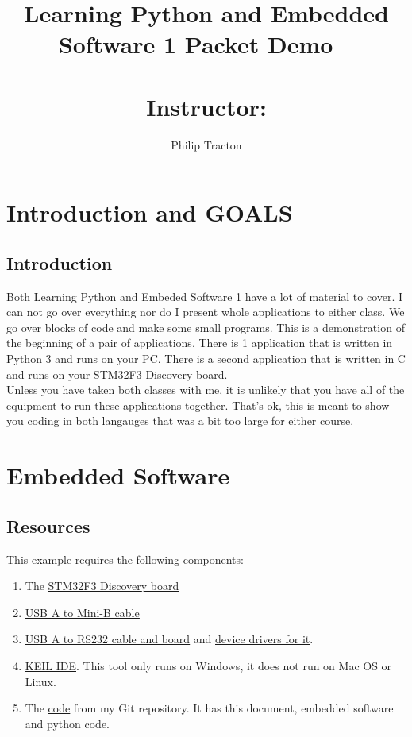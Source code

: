 \documentclass[12pt, svgnames, titlepage]{report}
\title{Learning Python and Embedded Software 1 Packet Demo}
\author{Philip Tracton}
\date{}
\title{
\vspace{2in}
\textmd{\textbf{\hmwkClass\ \\ \hmwkTitle}}\\
\vspace{0.1in}\normalsize{Instructor: \textit{\hmwkClassInstructor}}\\
}
\author{\textbf{\hmwkAuthorName}}
\date{} %
\begin{document}
\maketitle


\tableofcontents
\newpage

\chapter{Introduction and GOALS}
\section{Introduction}
\noindent Both Learning Python and Embeded Software 1 have a lot of material to cover.  I can not go over everything nor do I present whole applications to either class.  We go over blocks of code and make some small programs.  This is a demonstration of the beginning of a pair of applications.  There is 1 application that is written in Python 3 and runs on your PC.  There is a second application that is written in C and runs on your \underline{\href{http://www.st.com/web/en/catalog/tools/FM116/SC959/SS1532/PF254044}{STM32F3 Discovery board}}.  \\

\vspace{0.5cm}
\noindent Unless you have taken both classes with me, it is unlikely that you have all of the equipment to run these applications together.  That's ok, this is meant to show you coding in both langauges that was a bit too large for either course.  \\

\chapter{Embedded Software}
\section{Resources}
This example requires the following components:
\begin{enumerate}
\item The \underline{\href{http://www.st.com/web/en/catalog/tools/FM116/SC959/SS1532/PF254044}{STM32F3 Discovery board}}
\item \underline{\href{http://www.monoprice.com/Product?c_id=103&cp_id=10303&cs_id=1030302&p_id=8635&seq=1&format=2}{USB A to Mini-B cable}}
\item \underline{\href{http://www.amazon.com/gp/product/B00CD264HG/ref=oh_aui_detailpage_o04_s00?ie=UTF8&psc=1}{USB A to RS232 cable and board}} and \underline{\href{http://www.silabs.com/products/interface/usbtouart/Pages/usb-to-uart-bridge.aspx}{device drivers for it}}.
\item \underline{\href{http://www.keil.com/download/product/}{KEIL IDE}}.  This tool only runs on Windows, it does not run on Mac OS or Linux.
\item The \underline{\href{https://github.com/ptracton/packet_demo}{code}} from my Git repository.  It has this document, embedded software and python code.
\end{enumerate}
\newpage
\end{document}
